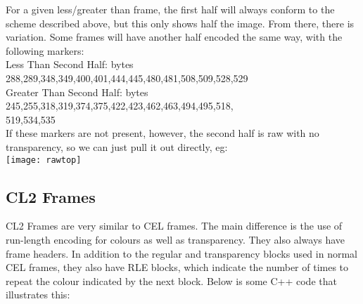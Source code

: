 \begin{itemize}
	For a given less/greater than frame, the first half will always conform to the scheme described above, but this only shows half the image.
	From there, there is variation. Some frames will have another half encoded the same way, with the following markers:\\
	Less Than Second Half: bytes 288,289,348,349,400,401,444,445,480,481,508,509,528,529\\
	Greater Than Second Half: bytes 245,255,318,319,374,375,422,423,462,463,494,495,518,\\
	519,534,535\\
	
	If these markers are not present, however, the second half is raw with no transparency, so we can just pull it out directly, eg:\\
	\texttt{[image: rawtop]}
\end{itemize}

\newpage

\subsection{CL2 Frames}
	CL2 Frames are very similar to CEL frames. The main difference is the use of run-length encoding for colours as well as transparency. They also always have frame headers.
   In addition to the regular and transparency blocks used in normal CEL frames, they also have RLE blocks, which indicate the number of times to repeat the colour indicated by the next block.
   Below is some C++ code that illustrates this:
   
